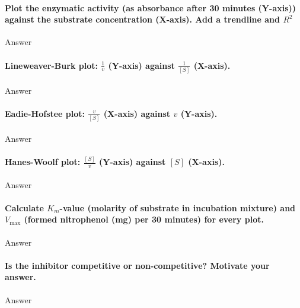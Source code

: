 \documentclass[a4paper,12pt]{article}
\begin{document}
\paragraph{Plot the enzymatic activity (as absorbance after 30 minutes (Y-axis)) 
against the substrate concentration (X-axis). Add a trendline and $R^2$}

Answer\\

\paragraph{Lineweaver-Burk plot: $\frac{1}{v}$ (Y-axis) against $\frac{1}{[S]}$ (X-axis).}

Answer\\

\paragraph{Eadie-Hofstee plot: $\frac{v}{[S]}$ (X-axis) against $v$ (Y-axis).}

Answer\\

\paragraph{Hanes-Woolf plot: $\frac{[S]}{v}$ (Y-axis) against $[S]$ (X-axis).}

Answer\\

\paragraph{Calculate $K_m$-value (molarity of substrate in incubation mixture) and $V_{\text{max}}$ (formed nitrophenol (mg) per 30 minutes) for every plot.}
 
 Answer\\

\paragraph{Is the inhibitor competitive or non-competitive? Motivate your answer.}

Answer\\
\end{document}
